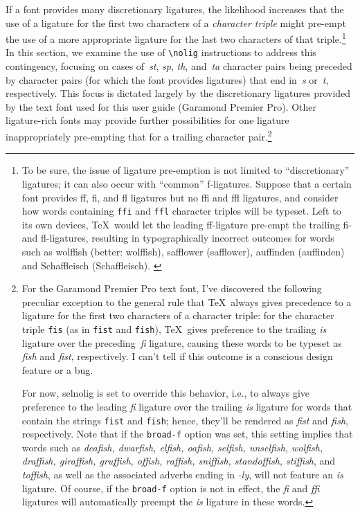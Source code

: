 \documentclass[12pt]{article}
\newcommand{\pkg}[1]{\textsf{#1}}
\newcommand{\opt}[1]{\texttt{#1}}
\newcommand{\cmmd}[1]{\texttt{\textbackslash #1}}
\begin{document}
If a font provides many discretionary ligatures, the likelihood increases that the use of a ligature for the first two characters of a \emph{character triple} might pre-empt the use of a more appropriate ligature for the last two characters of that triple.\footnote{To be sure, the issue of ligature pre-emption is not limited to \enquote{discretionary} ligatures; it can also occur with \enquote{common} f-ligatures. Suppose that a certain font provides ff, fi, and fl ligatures but no ffi and ffl ligatures, and consider how words containing \opt{ffi} and \opt{ffl} character triples will be typeset. Left to its own devices, \TeX\ would let the leading ff-ligature pre-empt the trailing fi- and fl-ligatures, resulting in typographically incorrect outcomes for words such as wol\mbox{ff}ish (better: wolf\mbox{fi}sh), sa\mbox{ff}lower (safflower), au\mbox{ff}inden (auffinden) and Scha\mbox{ff}leisch (Schaffleisch). \label{fn:triple}} 
In this section, we examine the use of \cmmd{nolig} instructions to address this contingency, focusing on cases of~\emph{st}, \emph{sp}, \emph{th}, and~\emph{ta} character pairs being preceded by character pairs (for which the font provides ligatures) that end in~\emph{s} or~\emph{t}, respectively. This focus is dictated largely by the discretionary ligatures provided by the text font used for this user guide (Garamond Premier Pro). Other ligature-rich fonts may provide further possibilities for one ligature inappropriately pre-empting that for a trailing character pair.\footnote{For the Garamond Premier Pro text font, I've discovered the following preculiar  exception to the general rule that \TeX\ always gives precedence to a ligature for the first two characters of a character triple: for the character triple \opt{fis} (as in \opt{fist} and \opt{fish}), \TeX\ gives preference to the trailing \emph{is} ligature over the preceding  \,\emph{fi} ligature, causing these words to be typeset as \emph{f\mbox{is}h} and \emph{f\mbox{is}t}, respectively. I can't tell if this outcome is a conscious design feature or a bug.

For now, \pkg{selnolig} is set to override this behavior, i.e., to always give preference to the leading \emph{fi} ligature over the trailing \emph{is} ligature for words that contain the strings \opt{fist} and \opt{fish}; hence, they'll be rendered as \emph{fist} and \emph{fish}, respectively. Note that if the \opt{broad-f} option was set, this setting implies that words such as {\em deafish, dwarfish, elfish, oafish, selfish, unselfish, wolfish, draffish, giraffish, gruffish, offish, raffish, sniffish, standoffish, stiffish}, and \emph{toffish}, as well as the associated adverbs ending in \emph{-ly}, will not feature an \emph{is} ligature. Of course, if the \opt{broad-f} option is not in effect, the \emph{fi} and \emph{ffi} ligatures will automatically preempt the \emph{is} ligature in these words.}
\end{document}
